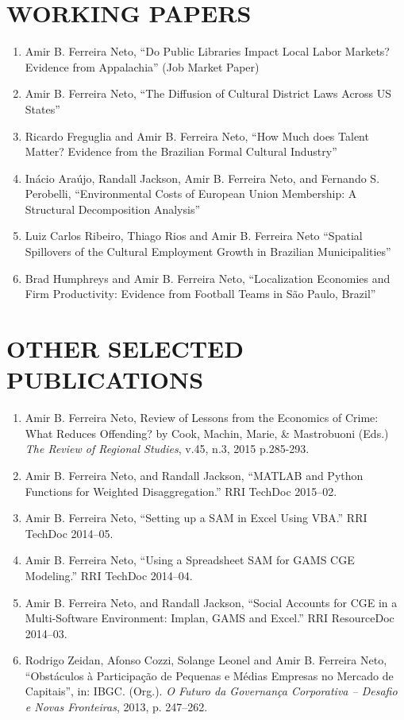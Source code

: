 \documentclass[11pt,a4paper,oneside]{article}
\begin{document}
\section{WORKING PAPERS}
\begin{enumerate}
  \item Amir B. Ferreira Neto, ``Do Public Libraries Impact Local Labor Markets? Evidence from Appalachia'' (Job Market Paper)
  \item Amir B. Ferreira Neto, ``The Diffusion of Cultural District Laws Across {US} States''
  \item Ricardo Freguglia and Amir B. Ferreira Neto, ``How Much does Talent Matter? Evidence from the Brazilian Formal Cultural Industry''
  \item In\'acio Ara\'ujo, Randall Jackson, Amir B. Ferreira Neto, and Fernando S. Perobelli, ``Environmental Costs of European Union Membership: A Structural Decomposition Analysis''
  \item Luiz Carlos Ribeiro, Thiago Rios and Amir B. Ferreira Neto ``Spatial Spillovers of the Cultural Employment Growth in Brazilian Municipalities''
  \item Brad Humphreys and Amir B. Ferreira Neto, ``Localization Economies and Firm Productivity: Evidence from Football Teams in S\~ao Paulo, Brazil''
\end{enumerate}

\section{OTHER SELECTED PUBLICATIONS}
\begin{enumerate}
  \item Amir B. Ferreira Neto, Review of Lessons from the Economics of Crime: What Reduces Offending? by Cook, Machin, Marie, \& Mastrobuoni (Eds.) \emph{The Review of Regional Studies}, v.45, n.3, 2015  p.285-293.
  \item Amir B. Ferreira Neto, and Randall Jackson, ``MATLAB and Python Functions for Weighted Disaggregation.'' RRI TechDoc 2015--02.
  \item Amir B. Ferreira Neto, ``Setting up a SAM in Excel Using VBA.'' RRI TechDoc 2014--05.
  \item Amir B. Ferreira Neto, ``Using a Spreadsheet SAM for GAMS CGE Modeling.'' RRI TechDoc 2014--04.
  \item Amir B. Ferreira Neto, and Randall Jackson, ``Social Accounts for CGE in a Multi-Software Environment: Implan, GAMS and Excel.'' RRI ResourceDoc 2014--03.
  \item Rodrigo Zeidan, Afonso Cozzi, Solange Leonel and Amir B. Ferreira Neto, ``Obst\'aculos \`a Participa\c{c}\~ao de Pequenas e M\'edias Empresas no Mercado de Capitais'', in: IBGC. (Org.). \emph{O Futuro da Governan\c{c}a Corporativa -- Desafio e Novas Fronteiras}, 2013, p. 247--262.
\end{enumerate}
\end{document}
